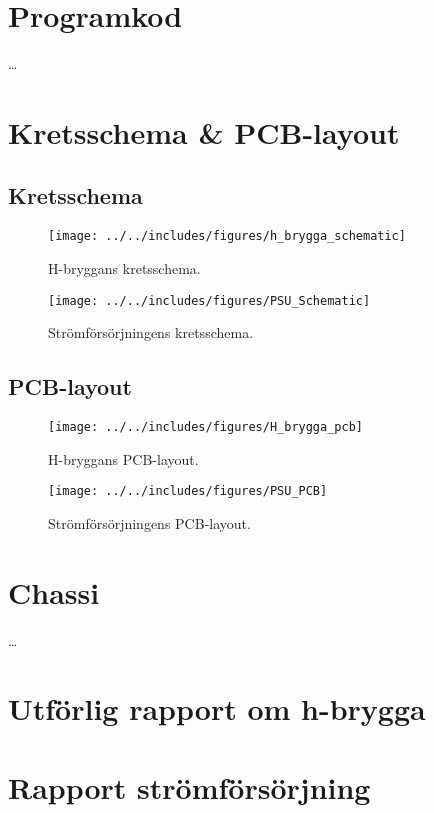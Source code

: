 \appendix

\section{Programkod}
\ldots

\section{Kretsschema \& PCB-layout}
\subsection{Kretsschema}
\begin{landscape}
\begin{figure}[htbp!]
\centering
\texttt{[image: ../../includes/figures/h\_brygga\_schematic]}
\caption{H-bryggans kretsschema.}
\label{fig:appendix_h_brygga_schema}
\end{figure}
\end{landscape}

\begin{landscape}
\begin{figure}[htbp!]
\centering
\texttt{[image: ../../includes/figures/PSU\_Schematic]}
\caption{Strömförsörjningens kretsschema.}
\label{fig:appendix_PSU_schema}
\end{figure}
\end{landscape}

\subsection{PCB-layout}
\begin{figure}[htbp!]
\centering
\texttt{[image: ../../includes/figures/H\_brygga\_pcb]}
\caption{H-bryggans PCB-layout.}
\label{fig:appendix_pcb_layout}
\end{figure}

\begin{figure}[htbp!]
\centering
\texttt{[image: ../../includes/figures/PSU\_PCB]}
\caption{Strömförsörjningens PCB-layout.}
\label{fig:appendix_PSU_pcb_layout}
\end{figure}

\section{Chassi}
\ldots
\section{Utförlig rapport om h-brygga}
\label{apx:H-bridge}


\section{Rapport strömförsörjning}
\label{apx:PSU}

